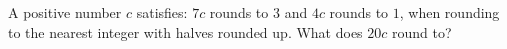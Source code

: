 A positive number $c$ satisfies: $7c$ rounds to $3$ and $4c$ rounds to $1$, when rounding to the nearest integer with halves rounded up. What does $20c$ round to?
